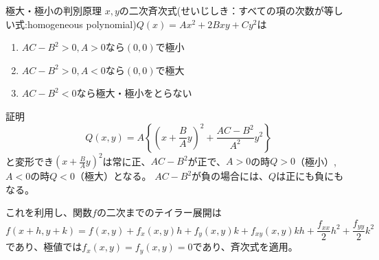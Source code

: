 \begin{slide}{極大・極小の判別原理}
$x,y$の二次斉次式(せいじしき：すべての項の次数が等しい式:homogeneous polynomial)$Q(x) = Ax^2 + 2Bxy+ Cy^2$は
\begin{enumerate}
\item $AC-B^2>0, A>0$なら$(0,0)$で極小
\item $AC-B^2>0, A<0$なら$(0,0)$で極大
\item $AC-B^2<0$なら極大・極小をとらない
\end{enumerate}
証明
\begin{equation}
Q(x,y) = A\left\{\left(x + \frac{B}{A}y\right)^2 + \frac{AC-B^2}{A^2}y^2\right\}\nonumber 
\end{equation}
と変形でき$(x + \frac{B}{A}y)^2$は常に正、$AC-B^2$が正で、$A>0$の時$Q>0$（極小）, $A<0$の時$Q<0$（極大）となる。
$AC-B^2$が負の場合には、$Q$は正にも負にもなる。

これを利用し、関数$f$の二次までのテイラー展開は
\begin{equation}
f(x+h, y+k) = f(x,y) + f_x(x,y)h + f_y(x,y)k + f_{xy}(x,y)kh + \frac{f_{xx}}{2}h^2 + \frac{f_{yy}}{2}k^2 \nonumber
\end{equation}
であり、極値では$f_x(x,y)=f_y(x,y)=0$であり、斉次式を適用。
\end{slide}








%

